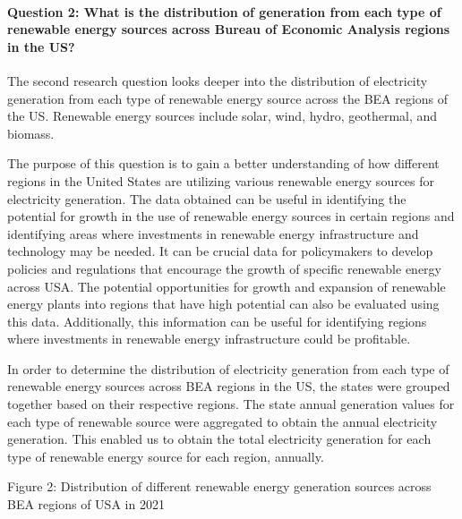 \documentclass[
]{article}
\begin{document}
\hypertarget{question-2-what-is-the-distribution-of-generation-from-each-type-of-renewable-energy-sources-across-bureau-of-economic-analysis-regions-in-the-us}{%
\paragraph{Question 2: What is the distribution of generation from each
type of renewable energy sources across Bureau of Economic Analysis
regions in the
US?}\label{question-2-what-is-the-distribution-of-generation-from-each-type-of-renewable-energy-sources-across-bureau-of-economic-analysis-regions-in-the-us}}

The second research question looks deeper into the distribution of
electricity generation from each type of renewable energy source across
the BEA regions of the US. Renewable energy sources include solar, wind,
hydro, geothermal, and biomass.

The purpose of this question is to gain a better understanding of how
different regions in the United States are utilizing various renewable
energy sources for electricity generation. The data obtained can be
useful in identifying the potential for growth in the use of renewable
energy sources in certain regions and identifying areas where
investments in renewable energy infrastructure and technology may be
needed. It can be crucial data for policymakers to develop policies and
regulations that encourage the growth of specific renewable energy
across USA. The potential opportunities for growth and expansion of
renewable energy plants into regions that have high potential can also
be evaluated using this data. Additionally, this information can be
useful for identifying regions where investments in renewable energy
infrastructure could be profitable.

In order to determine the distribution of electricity generation from
each type of renewable energy sources across BEA regions in the US, the
states were grouped together based on their respective regions. The
state annual generation values for each type of renewable source were
aggregated to obtain the annual electricity generation. This enabled us
to obtain the total electricity generation for each type of renewable
energy source for each region, annually.

Figure 2: Distribution of different renewable energy generation sources
across BEA regions of USA in 2021
\end{document}
